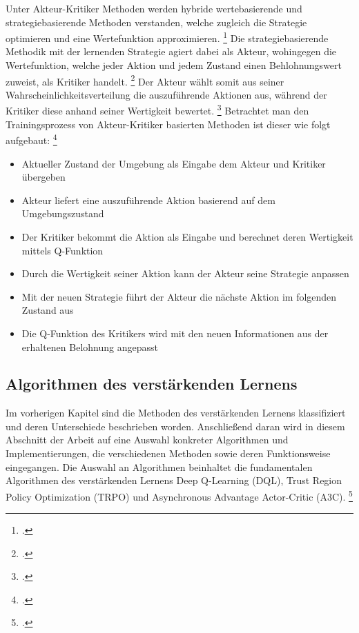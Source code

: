 Unter Akteur-Kritiker Methoden werden hybride wertebasierende und strategiebasierende Methoden verstanden, welche zugleich die Strategie optimieren und eine Wertefunktion approximieren. \footcite[Vgl.][S. 2f.]{Zhang.2018}
Die strategiebasierende Methodik mit der lernenden Strategie agiert dabei als Akteur, wohingegen die Wertefunktion, welche jeder Aktion und jedem Zustand einen Behlohnungswert zuweist, als Kritiker handelt. \footcite[Vgl.][S. 321]{Sutton.2018}
Der Akteur wählt somit aus seiner Wahrscheinlichkeitsverteilung die auszuführende Aktionen aus, während der Kritiker diese anhand seiner Wertigkeit bewertet. \footcite[Vgl.][S. 3]{Ningombam.2022}
Betrachtet man den Trainingsprozess von Akteur-Kritiker basierten Methoden ist dieser wie folgt aufgebaut: \footcite[Vgl.][S. 4]{Ningombam.2022}
\begin{itemize}
    \item Aktueller Zustand der Umgebung als Eingabe dem Akteur und Kritiker übergeben
    \item Akteur liefert eine auszuführende Aktion basierend auf dem Umgebungszustand
    \item Der Kritiker bekommt die Aktion als Eingabe und berechnet deren Wertigkeit mittels Q-Funktion
    \item Durch die Wertigkeit seiner Aktion kann der Akteur seine Strategie anpassen
    \item Mit der neuen Strategie führt der Akteur die nächste Aktion im folgenden Zustand aus
    \item Die Q-Funktion des Kritikers wird mit den neuen Informationen aus der erhaltenen Belohnung angepasst
\end{itemize}

\subsection{Algorithmen des verstärkenden Lernens}
Im vorherigen Kapitel sind die Methoden des verstärkenden Lernens klassifiziert und deren Unterschiede beschrieben worden.
Anschließend daran wird in diesem Abschnitt der Arbeit auf eine Auswahl konkreter Algorithmen und Implementierungen, die verschiedenen Methoden sowie deren Funktionsweise eingegangen.
Die Auswahl an Algorithmen beinhaltet die fundamentalen Algorithmen des verstärkenden Lernens Deep Q-Learning (DQL), Trust Region Policy Optimization (TRPO) und Asynchronous Advantage Actor-Critic (A3C). \footcite[Vgl.][S. 1]{Arulkumaran.2017}


